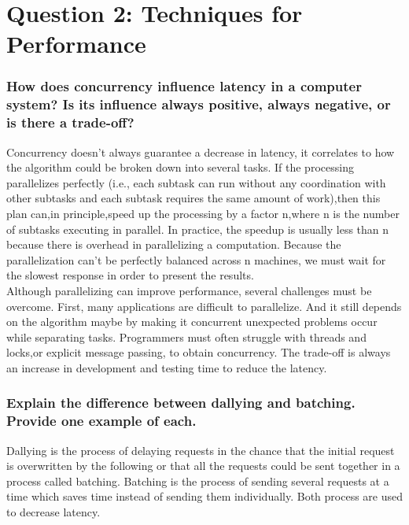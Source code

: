 \documentclass{article}      %
\begin{document}
\section{Question 2: Techniques for Performance}


\subsubsection{How does concurrency influence latency in a computer system? Is its
influence always positive, always negative, or is there a trade-off?}

Concurrency doesn't always guarantee a decrease in latency, it correlates to how the algorithm could be broken down into several tasks. If the processing parallelizes perfectly (i.e., each subtask can run without any coordination with other subtasks and each subtask requires the same amount of work),then this plan can,in principle,speed up the processing by a factor n,where n is the number of subtasks executing in parallel. In practice, the speedup is usually less than n because there is overhead in parallelizing a computation. Because the parallelization can't be perfectly balanced across n machines,  we must wait for the slowest response in order to present the results.  \\

Although parallelizing can improve performance, several challenges must be overcome. First, many applications are difficult to parallelize. And it still depends on the algorithm maybe by making it concurrent unexpected problems occur while separating tasks. Programmers must often struggle with threads and locks,or explicit message passing, to obtain concurrency. The trade-off is always an increase in development and testing time to reduce the latency.\\

\subsubsection{Explain the difference between dallying and batching. Provide one example of each.}

Dallying is the process of delaying requests in the chance that the initial request is overwritten by the following or that all the requests could be sent together in a process called batching. Batching is the process of sending several requests at a time  which saves time instead of sending them individually. Both process are used to decrease latency. \\
\end{document}
